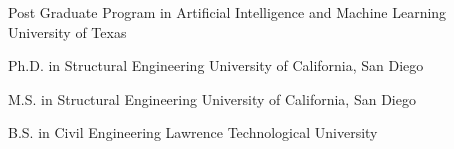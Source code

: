 \documentclass{leresume}
\begin{document}
\begin{bulletedlist}
	\end{bulletedlist}

	
                {Post Graduate Program in Artificial Intelligence and Machine Learning}
                {University of Texas}
		
                {Ph.D. in Structural Engineering}
                {University of California, San Diego}
		
                {M.S. in Structural Engineering}
                {University of California, San Diego}
		
                {B.S. in Civil Engineering}
                {Lawrence Technological University}
		

    
\end{document}
